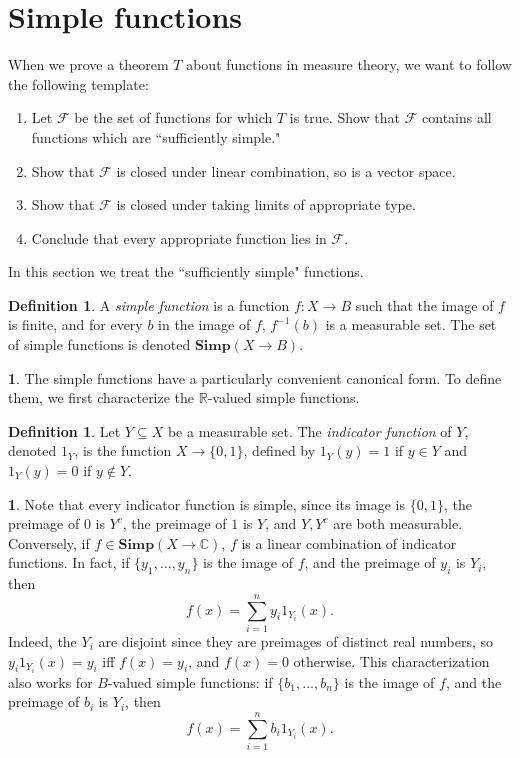 \documentclass[12pt]{book}
\newcommand{\RR}{\mathbb{R}}
\newcommand{\CC}{\mathbb{C}}
\newcommand{\Simp}{\mathbf{Simp}}
\newcommand{\dfn}[1]{\emph{#1}\index{#1}}
\theoremstyle{definition}
\newtheorem{subsec}[theorem]{}
\newtheorem{definition}[theorem]{Definition}
\begin{document}
\section{Simple functions}
When we prove a theorem $T$ about functions in measure theory, we want to follow the following template:
\begin{enumerate}
\item Let $\mathcal F$ be the set of functions for which $T$ is true. Show that $\mathcal F$ contains all functions which are ``sufficiently simple."
\item Show that $\mathcal F$ is closed under linear combination, so is a vector space.
\item Show that $\mathcal F$ is closed under taking limits of appropriate type.
\item Conclude that every appropriate function lies in $\mathcal F$.
\end{enumerate}
In this section we treat the ``sufficiently simple" functions.

\begin{definition}
A \dfn{simple function} is a function $f: X \to B$ such that the image of $f$ is finite, and for every $b$ in the image of $f$, $f^{-1}(b)$ is a measurable set.
The set of simple functions is denoted $\Simp(X \to B)$.
\end{definition}

\begin{subsec}
The simple functions have a particularly convenient canonical form.
To define them, we first characterize the $\RR$-valued simple functions.
\end{subsec}

\begin{definition}
Let $Y \subseteq X$ be a measurable set. The \dfn{indicator function} of $Y$, denoted $1_Y$, is the function $X \to \{0, 1\}$, defined by $1_Y(y) = 1$ if $y \in Y$ and $1_Y(y) = 0$ if $y \notin Y$.
\end{definition}

\begin{subsec}
Note that every indicator function is simple, since its image is $\{0, 1\}$, the preimage of $0$ is $Y^c$, the preimage of $1$ is $Y$, and $Y,Y^c$ are both measurable.
Conversely, if $f \in \Simp(X \to \CC)$, $f$ is a linear combination of indicator functions. In fact, if $\{y_1, \dots, y_n\}$ is the image of $f$, and the preimage of $y_i$ is $Y_i$, then
$$f(x) = \sum_{i=1}^n y_i1_{Y_i}(x).$$
Indeed, the $Y_i$ are disjoint since they are preimages of distinct real numbers, so $y_i1_{Y_i}(x) = y_i$ iff $f(x) = y_i$, and $f(x) = 0$ otherwise.
This characterization also works for $B$-valued simple functions: if $\{b_1, \dots, b_n\}$ is the image of $f$, and the preimage of $b_i$ is $Y_i$, then
$$f(x) = \sum_{i=1}^n b_i1_{Y_i}(x).$$
\end{subsec}
\end{document}
